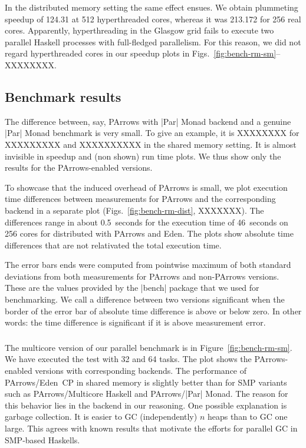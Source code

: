 In the distributed memory setting the same effect ensues. We obtain
plummeting speedup of 124.31 at 512 hyperthreaded cores, whereas it was
213.172 for 256 real cores. Apparently, hyperthreading in the Glasgow
grid fails to execute two parallel Haskell processes with full-fledged
parallelism. For this reason, we did not regard hyperthreaded cores in
our speedup plots in Figs.~\ref{fig:bench-rm-sm}--XXXXXXXX.




\subsection{Benchmark results}

The difference between, say, PArrows with |Par| Monad backend and a
genuine |Par|
Monad benchmark is very small. To give an example, it is XXXXXXXX for
XXXXXXXXX and XXXXXXXXXX in the shared memory setting. It is almost invisible in speedup and
(non shown) run time plots. We thus show only the results for the
PArrows-enabled versions.

To showcase that the induced overhead of
PArrows is small, we plot execution time differences between measurements for
PArrows and the corresponding backend in a separate plot
(Figs.~\ref{fig:bench-rm-dist}, XXXXXXX). The differences range in
about 0.5~seconds for the execution time of 46~seconds on 256 cores
for distributed \rmtest with PArrows and Eden. The plots show absolute
time differences that are not relativated \wrt the total execution time.

The error bars ends were computed from pointwise maximum of both standard
deviations from both measurements for PArrows and non-PArrows
versions. These are the values provided by the |bench| package that we
used for benchmarking. We call a difference between two versions
significant when the border of the error bar of absolute time
difference is above or below zero. In other words: the time
difference is significant if it is above measurement error.

\subsubsection{\rmtest}
The multicore version of our parallel \rmtest benchmark is in
Figure~\ref{fig:bench-rm-sm}. We have executed the test with 32 and 64
tasks. The plot shows the PArrows-enabled versions with corresponding backends.
The performance of PArrows/Eden~CP in shared memory is slightly better than
for SMP variants such as PArrows/Multicore Haskell and PArrows/|Par|
Monad. The reason for this behavior lies in the backend in our reasoning. One
possible explanation is garbage collection. It is easier to GC
(independently) $n$ heaps than to GC one large. This agrees with known
results that motivate the efforts for
parallel GC in SMP-based Haskells.

